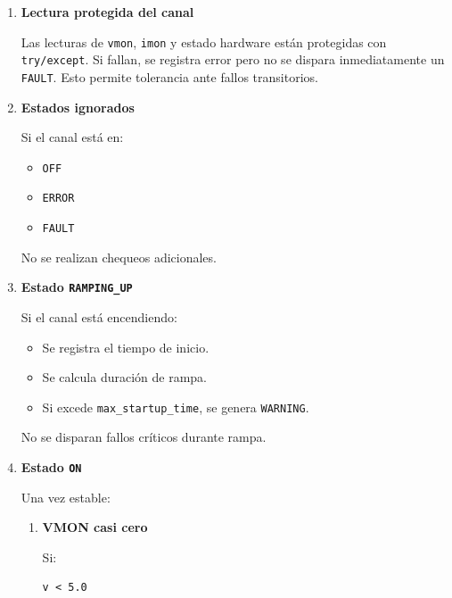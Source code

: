 \documentclass{article}
\begin{document}
\begin{enumerate}
\begin{enumerate}
Calcula el tiempo transcurrido desde la última lectura válida:

\begin{lstlisting}
dt_last_ok = now - self.last_ok.get(ch.ch, now)
\end{lstlisting}

Si excede \texttt{max\_silence}, se considera congelamiento del backend y se llama a \texttt{\_fault}.

\item \textbf{Lectura protegida del canal}

Las lecturas de \texttt{vmon}, \texttt{imon} y estado hardware están protegidas con \texttt{try/except}.  
Si fallan, se registra error pero no se dispara inmediatamente un \texttt{FAULT}.  
Esto permite tolerancia ante fallos transitorios.

\item \textbf{Estados ignorados}

Si el canal está en:

\begin{itemize}
    \item \texttt{OFF}
    \item \texttt{ERROR}
    \item \texttt{FAULT}
\end{itemize}

No se realizan chequeos adicionales.

\item \textbf{Estado \texttt{RAMPING\_UP}}

Si el canal está encendiendo:

\begin{itemize}
    \item Se registra el tiempo de inicio.
    \item Se calcula duración de rampa.
    \item Si excede \texttt{max\_startup\_time}, se genera \texttt{WARNING}.
\end{itemize}

No se disparan fallos críticos durante rampa.

\item \textbf{Estado \texttt{ON}}

Una vez estable:

\begin{enumerate}

\item \textbf{VMON casi cero}

Si:

\begin{lstlisting}
v < 5.0
\end{lstlisting}


\end{enumerate}
\end{enumerate}
\end{enumerate}
\end{document}
